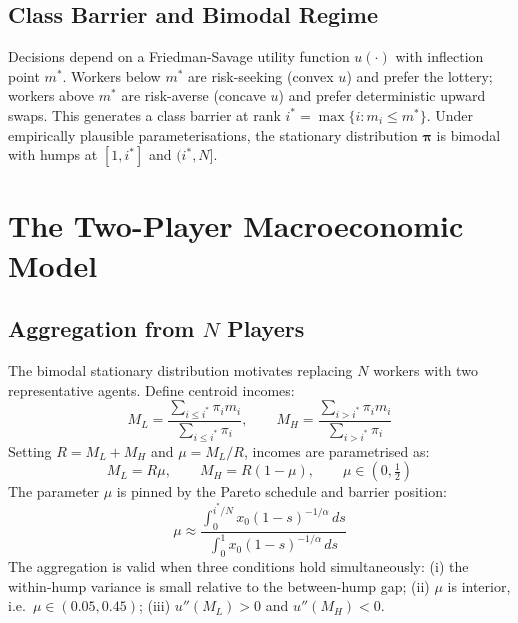\documentclass[12pt,a4paper]{article}
\begin{document}
\subsection{Class Barrier and Bimodal Regime}

Decisions depend on a Friedman-Savage utility function $u(\cdot)$ with
inflection point $m^*$. Workers below $m^*$ are risk-seeking (convex $u$)
and prefer the lottery; workers above $m^*$ are risk-averse (concave $u$)
and prefer deterministic upward swaps. This generates a class barrier
at rank $i^* = \max\{i : m_i \leq m^*\}$. Under empirically plausible
parameterisations, the stationary distribution $\boldsymbol{\pi}$ is
bimodal with humps at $[1, i^*]$ and $(i^*, N]$.

\section{The Two-Player Macroeconomic Model}

\subsection{Aggregation from $N$ Players}

The bimodal stationary distribution motivates replacing $N$ workers
with two representative agents. Define centroid incomes:
\begin{equation}
  M_L = \frac{\sum_{i \leq i^*} \pi_i m_i}{\sum_{i \leq i^*} \pi_i},
  \qquad
  M_H = \frac{\sum_{i > i^*} \pi_i m_i}{\sum_{i > i^*} \pi_i}
\end{equation}
Setting $R = M_L + M_H$ and $\mu = M_L / R$, incomes are parametrised as:
\begin{equation}
  M_L = R\mu, \qquad M_H = R(1-\mu), \qquad \mu \in \left(0, \tfrac{1}{2}\right)
  \label{eq:mu_def}
\end{equation}
The parameter $\mu$ is pinned by the Pareto schedule and barrier position:
\begin{equation}
  \mu \approx \frac{\int_0^{i^*/N} x_0(1-s)^{-1/\alpha}\,ds}
                   {\int_0^1 x_0(1-s)^{-1/\alpha}\,ds}
  \label{eq:mu_pareto}
\end{equation}
The aggregation is valid when three conditions hold simultaneously:
(i) the within-hump variance is small relative to the between-hump gap;
(ii) $\mu$ is interior, i.e.\ $\mu \in (0.05, 0.45)$;
(iii) $u''(M_L) > 0$ and $u''(M_H) < 0$.
\end{document}
